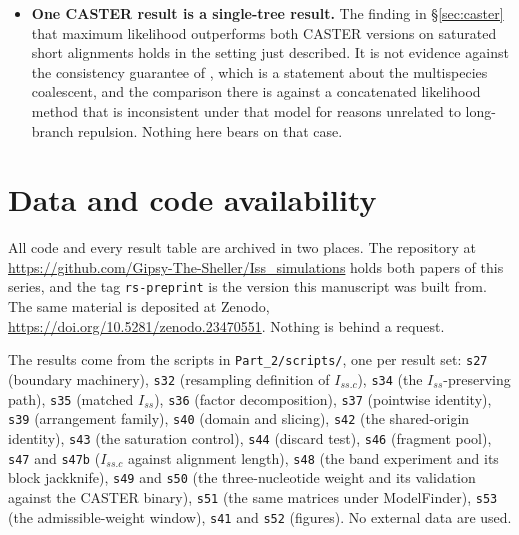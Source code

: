 \documentclass[preprint,12pt,authoryear]{elsarticle}
\newcommand{\Iss}{I_{ss}}
\newcommand{\Issc}{I_{ss.c}}
\theoremstyle{definition}
\theoremstyle{remark}
\begin{document}
\begin{itemize}
  sensitivity of the result to which fragments were drawn, which is the
  relevant variability here, but it is not a confidence interval over
  replicate studies.
\item \textbf{One CASTER result is a single-tree result.} The finding in
  \S\ref{sec:caster} that maximum likelihood outperforms both CASTER
  versions on saturated short alignments holds in the setting just
  described. It is not evidence against the consistency guarantee of
  \citet{zhang2025caster}, which is a statement about the multispecies
  coalescent, and the comparison there is against a concatenated likelihood
  method that is inconsistent under that model for reasons unrelated to
  long-branch repulsion. Nothing here bears on that case.
\end{itemize}

\section*{Data and code availability}

All code and every result table are archived in two places. The repository
at \url{https://github.com/Gipsy-The-Sheller/Iss_simulations} holds both
papers of this series, and the tag \texttt{rs-preprint} is the version this
manuscript was built from. The same material is deposited at Zenodo,
\url{https://doi.org/10.5281/zenodo.23470551}. Nothing is behind a request.

The results come from the scripts in \texttt{Part\_2/scripts/}, one per
result set:
\texttt{s27} (boundary machinery), \texttt{s32} (resampling definition of
$\Issc$), \texttt{s34} (the $\Iss$-preserving path), \texttt{s35} (matched
$\Iss$), \texttt{s36} (factor decomposition), \texttt{s37} (pointwise
identity), \texttt{s39} (arrangement family), \texttt{s40} (domain and
slicing), \texttt{s42} (the shared-origin identity), \texttt{s43} (the
saturation control), \texttt{s44} (discard test), \texttt{s46} (fragment
pool), \texttt{s47} and \texttt{s47b} ($\Issc$ against alignment length),
\texttt{s48} (the band experiment and its block jackknife), \texttt{s49} and
\texttt{s50} (the three-nucleotide weight and its validation against the
CASTER binary), \texttt{s51} (the same matrices under ModelFinder),
\texttt{s53} (the admissible-weight window), \texttt{s41} and \texttt{s52}
(figures).
No external data are used.

\end{document}
